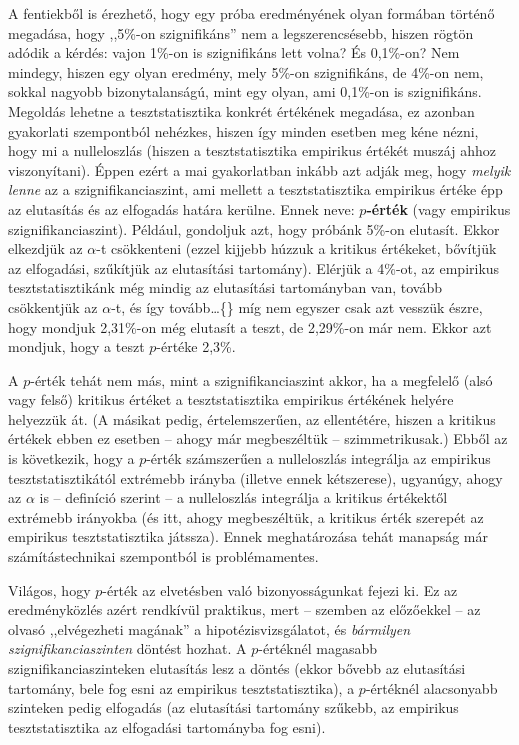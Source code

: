 \documentclass[
]{book}
\begin{document}
A fentiekből is érezhető, hogy egy próba eredményének olyan formában történő megadása, hogy ,,5\%-on szignifikáns'' nem a legszerencsésebb, hiszen rögtön adódik a kérdés: vajon 1\%-on is szignifikáns lett volna? És 0,1\%-on? Nem mindegy, hiszen egy olyan eredmény, mely 5\%-on szignifikáns, de 4\%-on nem, sokkal nagyobb bizonytalanságú, mint egy olyan, ami 0,1\%-on is szignifikáns. Megoldás lehetne a tesztstatisztika konkrét értékének megadása, ez azonban gyakorlati szempontból nehézkes, hiszen így minden esetben meg kéne nézni, hogy mi a nulleloszlás (hiszen a tesztstatisztika empirikus értékét muszáj ahhoz viszonyítani). Éppen ezért a mai gyakorlatban inkább azt adják meg, hogy \emph{melyik lenne} az a szignifikanciaszint, ami mellett a tesztstatisztika empirikus értéke épp az elutasítás és az elfogadás határa kerülne. Ennek neve: \textbf{\(p\)-érték} (vagy empirikus szignifikanciaszint). Például, gondoljuk azt, hogy próbánk 5\%-on elutasít. Ekkor elkezdjük az \(\alpha\)-t csökkenteni (ezzel kijjebb húzzuk a kritikus értékeket, bővítjük az elfogadási, szűkítjük az elutasítási tartomány). Elérjük a 4\%-ot, az empirikus tesztstatisztikánk még mindig az elutasítási tartományban van, tovább csökkentjük az \(\alpha\)-t, és így tovább\dots\{\} míg nem egyszer csak azt vesszük észre, hogy mondjuk 2,31\%-on még elutasít a teszt, de 2,29\%-on már nem. Ekkor azt mondjuk, hogy a teszt \(p\)-értéke 2,3\%.

A \(p\)-érték tehát nem más, mint a szignifikanciaszint akkor, ha a megfelelő (alsó vagy felső) kritikus értéket a tesztstatisztika empirikus értékének helyére helyezzük át. (A másikat pedig, értelemszerűen, az ellentétére, hiszen a kritikus értékek ebben ez esetben -- ahogy már megbeszéltük -- szimmetrikusak.) Ebből az is következik, hogy a \(p\)-érték számszerűen a nulleloszlás integrálja az empirikus tesztstatisztikától extrémebb irányba (illetve ennek kétszerese), ugyanúgy, ahogy az \(\alpha\) is -- definíció szerint -- a nulleloszlás integrálja a kritikus értékektől extrémebb irányokba (és itt, ahogy megbeszéltük, a kritikus érték szerepét az empirikus tesztstatisztika játssza). Ennek meghatározása tehát manapság már számítástechnikai szempontból is problémamentes.

Világos, hogy \(p\)-érték az elvetésben való bizonyosságunkat fejezi ki. Ez az eredményközlés azért rendkívül praktikus, mert -- szemben az előzőekkel -- az olvasó ,,elvégezheti magának'' a hipotézisvizsgálatot, és \emph{bármilyen szignifikanciaszinten} döntést hozhat. A \(p\)-értéknél magasabb szignifikanciaszinteken elutasítás lesz a döntés (ekkor bővebb az elutasítási tartomány, bele fog esni az empirikus tesztstatisztika), a \(p\)-értéknél alacsonyabb szinteken pedig elfogadás (az elutasítási tartomány szűkebb, az empirikus tesztstatisztika az elfogadási tartományba fog esni).
\end{document}
